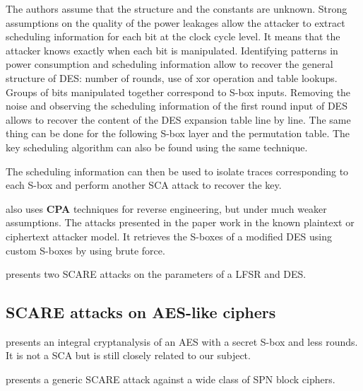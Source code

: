 \documentclass[11pt]{sdm}
\begin{document}
The authors assume that the structure and the constants are unknown.
Strong assumptions on the quality of the power leakages allow the attacker to extract scheduling information for each bit at the clock cycle level.
It means that the attacker knows exactly when each bit is manipulated.
Identifying patterns in power consumption and scheduling information allow to recover the general structure of DES: number of rounds, use of xor operation and table lookups.
Groups of bits manipulated together correspond to S-box inputs.
Removing the noise and observing the scheduling information of the first round input of DES allows to recover the content of the DES expansion table line by line.
The same thing can be done for the following S-box layer and the permutation table.
The key scheduling algorithm can also be found using the same technique.

The scheduling information can then be used to isolate traces corresponding to each S-box and perform another SCA attack to recover the key.

\smallbreak
\parencite{Guilley_Sauvage_Micolod_Réal_Valette_2010} also uses \textbf{CPA} techniques for reverse engineering, but under much weaker assumptions.
The attacks presented in the paper work in the known plaintext or ciphertext attacker model.
It retrieves the S-boxes of a modified DES using custom S-boxes by using brute force.



\parencite{Guilley_Sauvage_Micolod_Réal_Valette_2010} presents two SCARE attacks on the parameters of a LFSR and DES.

\subsection{SCARE attacks on AES-like ciphers}

\parencite{Tiessen_Knudsen_Kölbl_Lauridsen_2015} presents an integral cryptanalysis of an AES with a secret S-box and less rounds. It is not a SCA but is still closely related to our subject.

\parencite{Rivain_Roche_2013} presents a generic SCARE attack against a wide class of SPN block ciphers.
\end{document}
